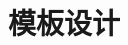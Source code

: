 \documentclass[utf8,zihao=-4,handout,smaller,aspectratio=1610]{ctexbeamer}
\begin{document}
\section*{模板设计}
    


\end{document}
